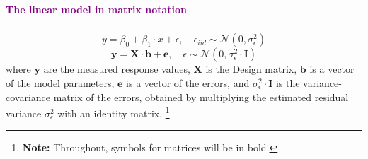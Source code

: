 \documentclass{beamer}
\begin{document}
\begin{frame}
    \frametitle{}
    \begin{center}
        \huge\textbf{\textcolor{purple}{The linear model in matrix notation}}
    \end{center}
\end{frame}

\begin{frame}
    \frametitle{}
    \begin{equation*}
        y = \beta_0 + \beta_1 \cdot x + \epsilon, \quad \epsilon_{iid} \sim \mathcal{N}(0, \sigma^2_{\epsilon})
    \end{equation*}
    \begin{equation*}
        \mathbf{y} = \mathbf{X} \cdot \mathbf{b} + \mathbf{e}, \quad \epsilon \sim \mathcal{N}(0, \sigma^2_{\epsilon} \cdot \mathbf{I})
    \end{equation*}
    where $\mathbf{y}$ are the measured response values, $\mathbf{X}$ is the Design matrix, $\mathbf{b}$ is a vector of the model parameters, $\mathbf{e}$ is a vector of the errors, and $\sigma^2_{\epsilon} \cdot \mathbf{I}$ is the variance-covariance matrix of the errors, obtained by multiplying the estimated residual variance $\sigma^2_{\epsilon}$ with an identity matrix. \footnote{\textbf{Note:} Throughout, symbols for matrices will be in bold.}
    

\end{frame}
\end{document}
